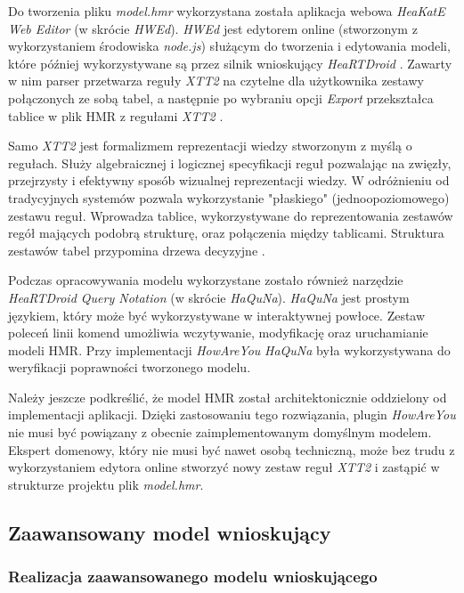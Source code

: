 Do tworzenia pliku \textit{model.hmr} wykorzystana została aplikacja webowa \textit{HeaKatE Web Editor} (w skrócie \textit{HWEd}). \textit{HWEd} jest edytorem online (stworzonym z wykorzystaniem środowiska \textit{node.js}) służącym do tworzenia i edytowania modeli, które później wykorzystywane są przez silnik wnioskujący \textit{HeaRTDroid} \cite{heartdroid}. Zawarty w nim parser przetwarza reguły \textit{XTT2} na czytelne dla użytkownika zestawy połączonych ze sobą tabel, a następnie po wybraniu opcji \textit{Export} przekształca tablice w plik HMR z regułami \textit{XTT2} \cite{heartdroid}.

Samo \textit{XTT2} jest formalizmem reprezentacji wiedzy stworzonym z myślą o regułach. Służy algebraicznej i logicznej specyfikacji reguł pozwalając na zwięzły, przejrzysty i efektywny sposób wizualnej reprezentacji wiedzy. W odróżnieniu od tradycyjnych systemów pozwala wykorzystanie "płaskiego" (jednoopoziomowego) zestawu reguł. Wprowadza tablice, wykorzystywane do reprezentowania zestawów regół mających podobrą strukturę, oraz połączenia między tablicami. Struktura zestawów tabel przypomina drzewa decyzyjne \cite{AiWikiHekate}.

Podczas opracowywania modelu wykorzystane zostało również narzędzie \textit{HeaRTDroid Query Notation} (w skrócie \textit{HaQuNa}). \textit{HaQuNa} jest prostym językiem, który może być wykorzystywane w interaktywnej powłoce. Zestaw poleceń linii komend umożliwia wczytywanie, modyfikację oraz uruchamianie modeli HMR\cite{heartdroid}. Przy implementacji \textit{HowAreYou} \textit{HaQuNa} była wykorzystywana do weryfikacji poprawności tworzonego modelu.

Należy jeszcze podkreślić, że model HMR został architektonicznie oddzielony od implementacji aplikacji. Dzięki zastosowaniu tego rozwiązania, plugin \textit{HowAreYou} nie musi być powiązany z obecnie zaimplementowanym domyślnym modelem. Ekspert domenowy, który nie musi być nawet osobą techniczną, może bez trudu z wykorzystaniem edytora online stworzyć nowy zestaw reguł \textit{XTT2} i zastąpić w strukturze projektu plik \textit{model.hmr}.

\subsection{Zaawansowany model wnioskujący}

\subsubsection{Realizacja zaawansowanego modelu wnioskującego}

